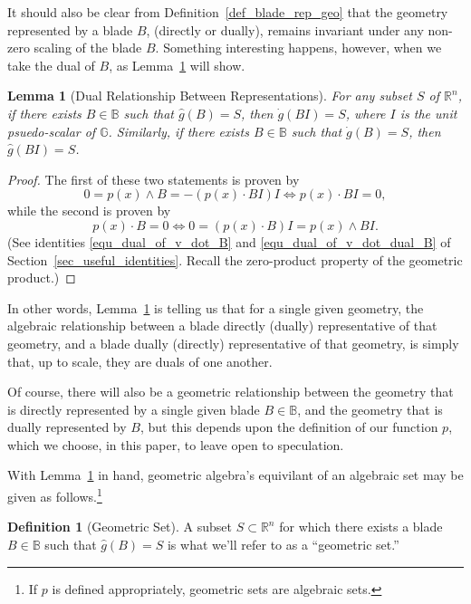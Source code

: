 \documentclass{birkjour}
\newtheorem{lem}[thm]{Lemma}
\theoremstyle{definition}
\newtheorem{defn}[thm]{Definition}
\theoremstyle{remark}
\numberwithin{equation}{section}
\newcommand{\R}{\mathbb{R}}
\newcommand{\B}{\mathbb{B}}
\newcommand{\G}{\mathbb{G}}
\newcommand{\gd}{\dot{g}}
\newcommand{\gh}{\hat{g}}
\begin{document}
It should also be clear from Definition~\ref{def_blade_rep_geo} that the geometry represented by a blade $B$, (directly or dually), remains invariant
under any non-zero scaling of the blade $B$.  Something interesting happens, however, when we take the dual of $B$, as Lemma~\ref{lem_dual_rep} will show.

\begin{lem}[Dual Relationship Between Representations]\label{lem_dual_rep}
For any subset $S$ of $\R^n$, if there exists $B\in\B$ such that $\gh(B)=S$, then $\gd(BI)=S$, where
$I$ is the unit psuedo-scalar of $\G$.  Similarly, if there exists $B\in\B$ such that $\gd(B)=S$, then $\gh(BI)=S$.
\end{lem}
\begin{proof}
The first of these two statements is proven by
\begin{equation*}
0=p(x)\wedge B=-(p(x)\cdot BI)I\iff p(x)\cdot BI=0,
\end{equation*}
while the second is proven by
\begin{equation*}
p(x)\cdot B=0\iff 0=(p(x)\cdot B)I=p(x)\wedge BI.
\end{equation*}
(See identities \eqref{equ_dual_of_v_dot_B} and \eqref{equ_dual_of_v_dot_dual_B} of Section~\ref{sec_useful_identities}.  Recall the zero-product property of the geometric product.)
\end{proof}

In other words, Lemma~\ref{lem_dual_rep} is telling us that for a single given geometry, the algebraic relationship between a
blade directly (dually) representative of that geometry, and a blade dually (directly) representative of that geometry, is simply
that, up to scale, they are duals of one another.

Of course, there will also be a geometric relationship between the geometry that is directly represented by a single given
blade $B\in\B$, and the geometry that is dually represented by $B$, but this depends upon the definition of our function
$p$, which we choose, in this paper, to leave open to speculation.

With Lemma~\ref{lem_dual_rep} in hand, geometric algebra's equivilant of an algebraic set may be given as follows.\footnote{If $p$ is
defined appropriately, geometric sets are algebraic sets.}

\begin{defn}[Geometric Set]\label{def_geo_set}
A subset $S\subset\R^n$ for which there exists a blade $B\in\B$ such that $\gh(B)=S$ is what we'll refer to as a ``geometric set.''
\end{defn}
\end{document}
